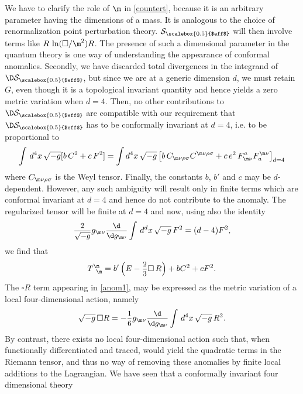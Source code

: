 \documentclass[a4paper,11pt,openright,twoside]{book}
\let\n=\nu      \let\x=\xi     \let\p=\pi      \let\r=\rho
\let\s=\sigma  \let\t=\tau     \let\u=\upsilon \let\f=\phi
\newcommand{\sdfrac}[2]{\mbox{\small$\displaystyle\frac{#1}{#2}$}}
\numberwithin{equation}{section}
\begin{document}
{{{	We have to clarify the role of $\m$ in \eqref{countert}, because it is an arbitrary parameter having the dimensions of a mass. It is analogous to the choice of renormalization point perturbation theory. $\mathcal{S}_{\scalebox{0.5}{$eff$}}$ will then involve terms like $R\,\ln(\square/\m^2)R$. The presence of such a dimensional parameter in the quantum theory is one way of understanding the appearance of conformal anomalies. Secondly, we have discarded total divergences in the integrand of $\D\mathcal{S}_{\scalebox{0.5}{$eff$}}$, but since we are at a generic dimension $d$, we must retain $G$, even though it is a topological invariant quantity and hence yields a zero metric variation when $d=4$. Then, no other contributions to $\D\mathcal{S}_{\scalebox{0.5}{$eff$}}$ are compatible with our requirement that $\D\mathcal{S}_{\scalebox{0.5}{$eff$}}$ has to be conformally invariant at $d=4$, i.e. to be proportional to 
	\begin{equation}
		\int\,d^4x\,\sqrt{-g}[b\,C^2+c\,F^2]=\int d^4x\,\sqrt{-g}\left[b\,C_{\m\n\r\s}C^{\m\n\r\s}+c\,e^2\,F^a_{\m\n}F^{\m\n}_a\right]_{d=4}
	\end{equation}
	where $C_{\m\n\r\s}$ is the Weyl tensor. Finally, the constants $b$, $b'$ and $c$ may be $d$-dependent. However, any such ambiguity will result only in finite terms which are conformal invariant at $d=4$ and hence do not contribute to the anomaly. The regularized tensor will be finite at $d=4$ and now, using also the identity
	\begin{equation}
		\sdfrac{2}{\sqrt{-g}}g_{\m\n}\sdfrac{\d}{\d g_{\m\n}}\int\,d^dx\,\sqrt{-g}\,F^2=(d-4)F^2,
	\end{equation}
	we find that 
	\begin{equation}
		T^\m_{\ \,\m}=b'\left(E-\sdfrac{2}{3}\square\,R\right)+b C^2+c F^2.\label{anom1}
	\end{equation}
	The $\square R$ term appearing in \eqref{anom1}, may be expressed as the metric variation of a local four-dimensional action, namely
	\begin{equation}
		\sqrt{-g}\,\square R=-\sdfrac{1}{6}g_{\m\n}\sdfrac{\d}{\d g_{\m\n}}\int\,d^4x\,\sqrt{-g}\, R^2.
	\end{equation}
	By contrast, there exists no local four-dimensional action such that, when functionally differentiated and traced, would yield the quadratic terms in the Riemann tensor, and thus no way of removing these anomalies by finite local additions to the Lagrangian. We have seen that a conformally invariant four dimensional theory
	\begin{equation}

\end{equation}}}}
\end{document}

